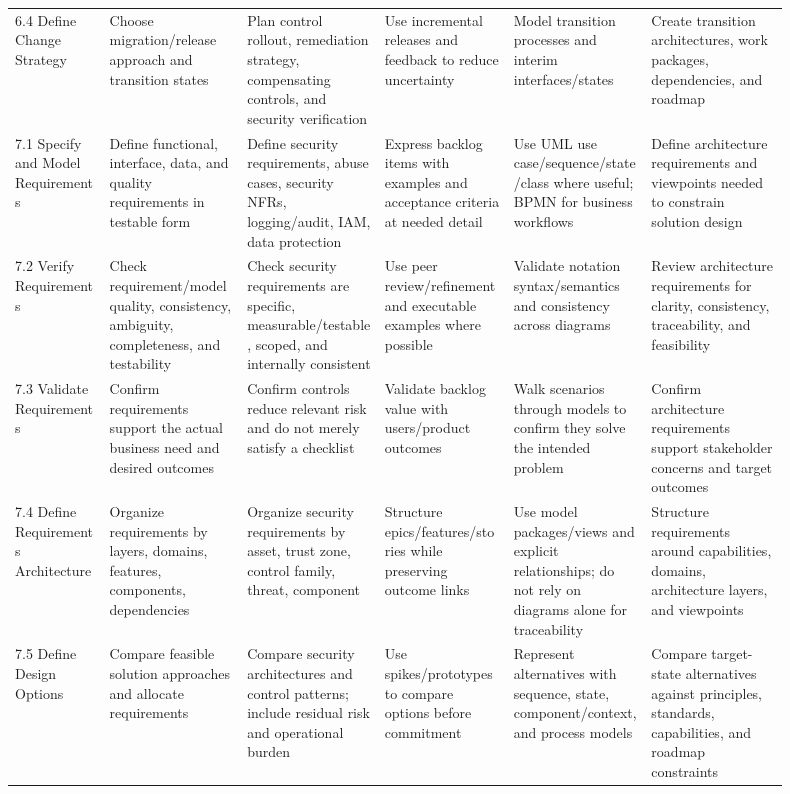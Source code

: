 \documentclass[11pt]{article}
\begin{document}
\begin{landscape}
\begin{longtable}{L{0.11\linewidth} L{0.16\linewidth} L{0.16\linewidth} L{0.15\linewidth} L{0.16\linewidth} L{0.16\linewidth}}
6.4 Define Change Strategy & Choose migration/release approach and transition states & Plan control rollout, remediation strategy, compensating controls, and security verification & Use incremental releases and feedback to reduce uncertainty & Model transition processes and interim interfaces/states & Create transition architectures, work packages, dependencies, and roadmap\\
7.1 Specify and Model Requirements & Define functional, interface, data, and quality requirements in testable form & Define security requirements, abuse cases, security NFRs, logging/audit, IAM, data protection & Express backlog items with examples and acceptance criteria at needed detail & Use UML use case/sequence/state/class where useful; BPMN for business workflows & Define architecture requirements and viewpoints needed to constrain solution design\\
7.2 Verify Requirements & Check requirement/model quality, consistency, ambiguity, completeness, and testability & Check security requirements are specific, measurable/testable, scoped, and internally consistent & Use peer review/refinement and executable examples where possible & Validate notation syntax/semantics and consistency across diagrams & Review architecture requirements for clarity, consistency, traceability, and feasibility\\
7.3 Validate Requirements & Confirm requirements support the actual business need and desired outcomes & Confirm controls reduce relevant risk and do not merely satisfy a checklist & Validate backlog value with users/product outcomes & Walk scenarios through models to confirm they solve the intended problem & Confirm architecture requirements support stakeholder concerns and target outcomes\\
7.4 Define Requirements Architecture & Organize requirements by layers, domains, features, components, dependencies & Organize security requirements by asset, trust zone, control family, threat, component & Structure epics/features/stories while preserving outcome links & Use model packages/views and explicit relationships; do not rely on diagrams alone for traceability & Structure requirements around capabilities, domains, architecture layers, and viewpoints\\
7.5 Define Design Options & Compare feasible solution approaches and allocate requirements & Compare security architectures and control patterns; include residual risk and operational burden & Use spikes/prototypes to compare options before commitment & Represent alternatives with sequence, state, component/context, and process models & Compare target-state alternatives against principles, standards, capabilities, and roadmap constraints\\

\end{longtable}
\end{landscape}
\end{document}
